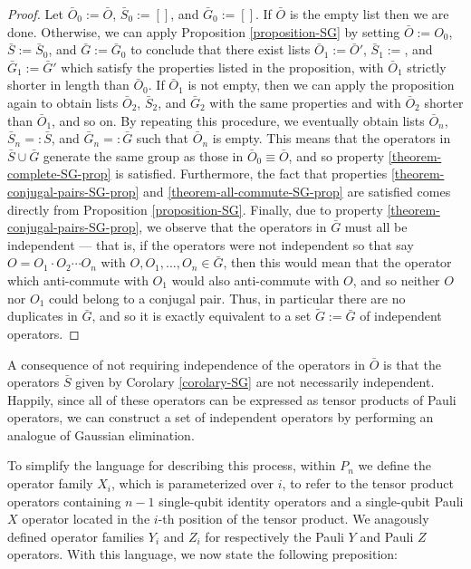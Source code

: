 \documentclass[twocolumn,showpacs,preprintnumbers,amsmath,amssymb,nofootinbib,pra,floatfix]{revtex4}
\newenvironment{remark}[1][Remark]{\begin{trivlist}
\item[\hskip \labelsep {\bfseries #1}]}{\end{trivlist}}
\begin{document}
\begin{proof}
Let $\bar O_0:=\bar O$, $\bar S_0:=[]$, and $\bar G_0:=[]$.  If $\bar O$ is the empty list then we are done.  Otherwise, we can apply Proposition \ref{proposition-SG} by setting $\bar O := O_0$, $\bar S:=\bar S_0$, and $\bar G := \bar G_0$ to conclude that there exist lists $\bar O_1:=\bar O'$, $\bar S_1:=$, and $\bar G_1:=\bar G'$ which satisfy the properties listed in the proposition, with $\bar O_1$ strictly shorter in length than $\bar O_0$.  If $\bar O_1$ is not empty, then we can apply the proposition again to obtain lists $\bar O_2$, $\bar S_2$, and $\bar G_2$ with the same properties and with $\bar O_2$ shorter than $\bar O_1$, and so on.  By repeating this procedure, we eventually obtain lists $\bar O_n$, $\bar S_n=:\bar S$, and $\bar G_n=:\bar G$ such that $\bar O_n$ is empty.  This means that the operators in $\bar S \cup \bar G$ generate the same group as those in $\bar O_0\equiv \bar O$, and so property \ref{theorem-complete-SG-prop} is satisfied.  Furthermore, the fact that properties \ref{theorem-conjugal-pairs-SG-prop} and \ref{theorem-all-commute-SG-prop} are satisfied comes directly from Proposition \ref{proposition-SG}.  Finally, due to property \ref{theorem-conjugal-pairs-SG-prop}, we observe that the operators in $\bar G$ must all be independent --- that is, if the operators were not independent so that say $O=O_1\cdot O_2\cdots O_n$ with $O,O_1,\dots,O_n\in\bar G$, then this would mean that the operator which anti-commute with $O_1$ would also anti-commute with $O$, and so neither $O$ nor $O_1$ could belong to a conjugal pair.  Thus, in particular there are no duplicates in $\bar G$, and so it is exactly equivalent to a set $\tilde G:=\bar G$ of independent operators.
\end{proof}
\begin{remark}
A consequence of not requiring independence of the operators in $\bar O$ is that the operators $\bar S$ given by Corolary \ref{corolary-SG} are not necessarily independent.  Happily, since all of these operators can be expressed as tensor products of Pauli operators, we can construct a set of independent operators by performing an analogue of Gaussian elimination.

To simplify the language for describing this process, within $P_n$ we define the operator family $X_i$, which is parameterized over $i$, to refer to the tensor product operators containing $n-1$ single-qubit identity operators and a single-qubit Pauli $X$ operator located in the $i$-th position of the tensor product.  We anagously defined operator families $Y_i$ and $Z_i$ for respectively the Pauli $Y$ and Pauli $Z$ operators.  With this language, we now state the following preposition:
\end{remark}
\end{document}
